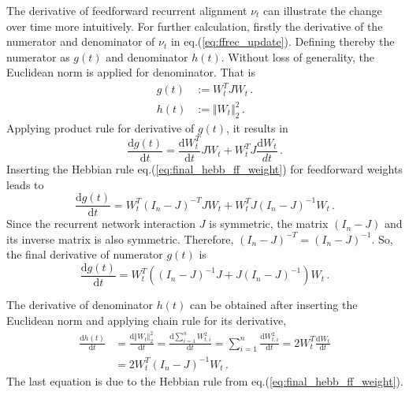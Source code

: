 \documentclass[11pt]{article}
\begin{document}
	The derivative of feedforward recurrent alignment $\nu_t$ can illustrate the change over time more intuitively. For further calculation, firstly the derivative of the numerator and denominator of $\nu_t$ in eq.(\ref{eq:ffrec_update}). Defining thereby the numerator as $g(t)$ and denominator $h(t)$. Without loss of generality, the Euclidean norm is applied for denominator. That is
		\begin{subequations}
			\begin{align} 
				g(t) &:= W_t^T J W_t \, .\\ 
				h(t) &:= \Vert W_t \Vert_2^2 \, .
			\end{align}
		\end{subequations}
	Applying product rule for derivative of $g(t)$, it results in
		\begin{equation}
				\frac{\mathrm{d}g(t)}{\mathrm{d}t} = \frac{\mathrm{d}W_t^T}{\mathrm{d}t} J W_t + W_t^T J \frac{\mathrm{d}W_t}{dt} \, .
		\end{equation}
	Inserting the Hebbian rule eq.(\ref{eq:final_hebb_ff_weight}) for feedforward weights leads to
		\begin{equation}
			\frac{\mathrm{d}g(t)}{\mathrm{d}t} = W_t^T (I_n - J)^{-T}J W_t + W_t^T J(I_n - J)^{-1} W_t \, .
		\end{equation}
	Since the recurrent network interaction $J$ is symmetric, the matrix $(I_n-J)$ and its inverse matrix is also symmetric. Therefore, $(I_n - J)^{-T} = (I_n - J)^{-1}$. So, the final derivative of numerator $g(t)$ is
		\begin{equation}
			\frac{\mathrm{d}g(t)}{\mathrm{d}t} = W_t^T \left( (I_n - J)^{-1}J + J(I_n - J)^{-1}\right)W_t \, .
		\end{equation}
	
	The derivative of denominator $h(t)$ can be obtained after inserting the Euclidean norm and applying chain rule for its derivative,  
		\begin{equation}
			\begin{split}
				\frac{\mathrm{d}h(t)}{\mathrm{d}t} & = \frac{\mathrm{d} \Vert W_t \Vert_2^2}{\mathrm{d}t} = \frac{\mathrm{d} \sum_{i=1}^{n} W_{t, i}^2}{\mathrm{d}t}
				= \sum_{i=1}^{n} \frac{\mathrm{d}W_{t,i}^2}{\mathrm{d}t} = 2W_t^T \frac{\mathrm{d}W_t}{\mathrm{d}t} \\
				& = 2W_t^T (I_n - J)^{-1} W_t \,.
			\end{split}
		\end{equation}
	The last equation is due to the Hebbian rule from eq.(\ref{eq:final_hebb_ff_weight}). 
	
\end{document}
